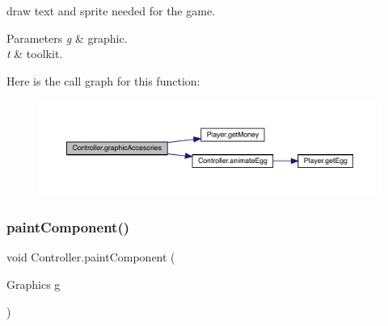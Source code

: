 draw text and sprite needed for the game. 
\begin{DoxyParams}{Parameters}
{\em g} & graphic. \\
\hline
{\em t} & toolkit. \\
\hline
\end{DoxyParams}
Here is the call graph for this function\+:
\nopagebreak
\begin{figure}[H]
\begin{center}
\leavevmode
\includegraphics[width=350pt]{class_controller_af6b9d4cd41e5bb90f04c0f61f5cfcd2d_cgraph}
\end{center}
\end{figure}
\mbox{\label{class_controller_a3d48c05f5876d46347a4b22f3d6d5a1a}} 
\subsubsection{\texorpdfstring{paint\+Component()}{paintComponent()}}
{\footnotesize\ttfamily void Controller.\+paint\+Component (\begin{DoxyParamCaption}\item[{Graphics}]{g }\end{DoxyParamCaption})\hspace{0.3cm}{\ttfamily [inline]}}

